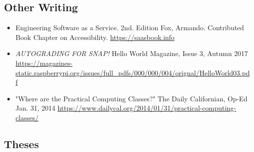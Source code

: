 \vspace{6pt}

\subsection{Other Writing}

\vspace{5pt}

\begin{itemize}

    \setlength\itemsep{1em}
    
    \item Engineering Software as a Service. 2nd. Edition Fox, Armando. Contributed Book Chapter on Accessibility.
    \newline
    \href{https://saasbook.info}{https://saasbook.info}

    \item{\textit{AUTOGRADING FOR SNAP!} Hello World Magazine, Issue 3, Autumn 2017}
    \newline
    \small{\href{https://magazines-static.raspberrypi.org/issues/full\_pdfs/000/000/004/orignal/HelloWorld03.pdf}{https://magazines-static.raspberrypi.org/issues/full\_pdfs/000/000/004/orignal/HelloWorld03.pdf}}
    
    \item{"Where are the Practical Computing Classes?" The Daily Californian, Op-Ed Jan. 31, 2014
    \newline
    \href{https://www.dailycal.org/2014/01/31/practical-computing-classes/}{https://www.dailycal.org/2014/01/31/practical-computing-classes/}}

\end{itemize}


\subsection{Theses}

\vspace{5pt}

